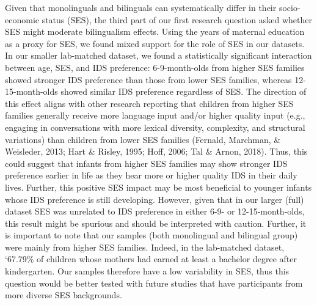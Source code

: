\documentclass[,man,floatsintext]{apa6}
\begin{document}
Given that monolinguals and bilinguals can systematically differ in their socio-economic status (SES), the third part of our first research question asked whether SES might moderate bilingualism effects. Using the years of maternal education as a proxy for SES, we found mixed support for the role of SES in our datasets. In our smaller lab-matched dataset, we found a statistically significant interaction between age, SES, and IDS preference: 6-9-month-olds from higher SES families showed stronger IDS preference than those from lower SES families, whereas 12-15-month-olds showed similar IDS preference regardless of SES. The direction of this effect aligns with other research reporting that children from higher SES families generally receive more language input and/or higher quality input (e.g., engaging in conversations with more lexical diversity, complexity, and structural variations) than children from lower SES families (Fernald, Marchman, \& Weisleder, 2013; Hart \& Risley, 1995; Hoff, 2006; Tal \& Arnon, 2018). Thus, this could suggest that infants from higher SES families may show stronger IDS preference earlier in life as they hear more or higher quality IDS in their daily lives. Further, this positive SES impact may be most beneficial to younger infants whose IDS preference is still developing. However, given that in our larger (full) dataset SES was unrelated to IDS preference in either 6-9- or 12-15-month-olds, this result might be spurious and should be interpreted with caution. Further, it is important to note that our samples (both monolingual and bilingual group) were mainly from higher SES families. Indeed, in the lab-matched dataset, `67.79\% of children whose mothers had earned at least a bachelor degree after kindergarten. Our samples therefore have a low variability in SES, thus this question would be better tested with future studies that have participants from more diverse SES backgrounds.
\end{document}
